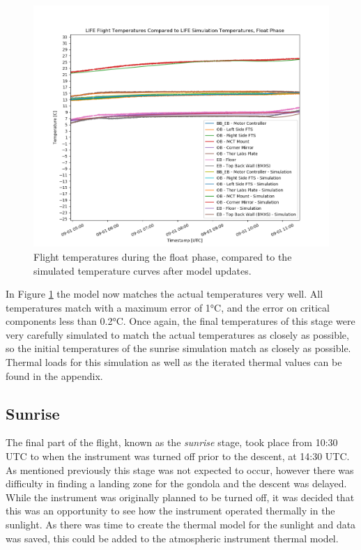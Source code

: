 \begin{figure}
    \centering
    \includegraphics[width=\textwidth]{chap4_images/float_images/float_with_sim_temps.png}
    \caption{Flight temperatures during the float phase, compared to the simulated temperature curves after model updates.}
    \label{fig:float_temps_with_sims}
\end{figure}

In Figure \ref{fig:float_temps_with_sims} the model now matches the actual temperatures very well. All temperatures match with a maximum error of 1°C, and the error on critical components less than 0.2°C. Once again, the final temperatures of this stage were very carefully simulated to match the actual temperatures as closely as possible, so the initial temperatures of the sunrise simulation match as closely as possible. Thermal loads for this simulation as well as the iterated thermal values can be found in the appendix.

\subsection{Sunrise}
The final part of the flight, known as the \textit{sunrise} stage, took place from 10:30 UTC to when the instrument was turned off prior to the descent, at 14:30 UTC. As mentioned previously this stage was not expected to occur, however there was difficulty in finding a landing zone for the gondola and the descent was delayed. While the instrument was originally planned to be turned off, it was decided that this was an opportunity to see how the instrument operated thermally in the sunlight. As there was time to create the thermal model for the sunlight and data was saved, this could be added to the atmospheric instrument thermal model.

